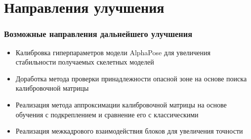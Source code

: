 \section{Направления улучшения}
\begin{frame}
    \frametitle{Возможные направления дальнейшего улучшения}
    \begin{itemize}
        \item Калибровка гиперпараметров модели AlphaPose для увеличения стабильности получаемых скелетных моделей
        \item Доработка метода проверки принадлежности опасной зоне на основе поиска калибровочной матрицы
        \item Реализация метода аппроксимации калибровочной матрицы на основе обучения с подкреплением и сравнение его с классическими
        \item Реализация межкадрового взаимодействия блоков для увеличения точности
    \end{itemize}
\end{frame}
